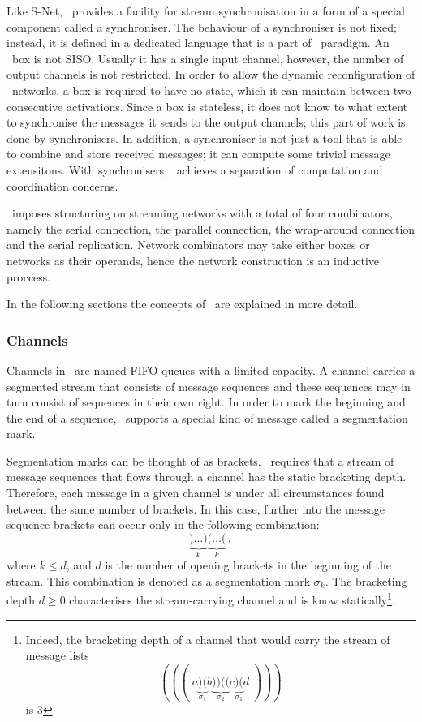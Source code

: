 Like S-Net, \ak\ provides a facility for stream synchronisation in a form of a special component called a synchroniser. The behaviour of a synchroniser is not fixed; instead, it is defined in a dedicated language that is a part of \ak\ paradigm. An \ak\ box is not SISO. Usually it has a single input channel, however, the number of output channels is not restricted. In order to allow the dynamic reconfiguration of \ak\ networks, a box is required to have no state, which it can maintain between two consecutive activations. Since a box is stateless, it does not know to what extent to synchronise the messages it sends to the output channels; this part of work is done by synchronisers. In addition, a synchroniser is not just a tool that is able to combine and store received messages; it can compute some trivial message extensitons. With synchronisers, \ak\ achieves a separation of computation and coordination concerns.

\ak\ imposes structuring on streaming networks with a total of four combinators, namely the serial connection, the parallel connection, the wrap-around connection and the serial replication. Network combinators may take either boxes or networks as their operands, hence the network construction is an inductive proccess. 

In the following sections the concepts of \ak\ are explained in more detail.


    \subsubsection{Channels}
Channels in \ak\ are named FIFO queues with a limited capacity. A channel carries a segmented stream that consists of message sequences and these sequences may in turn consist of sequences in their own right. In order to mark the beginning and the end of a sequence, \ak\ supports a special kind of message called a segmentation mark.

Segmentation marks can be thought of as brackets. \ak\ requires that a stream of message sequences that flows through a channel has the static bracketing depth. Therefore, each message in a given channel is under all circumstances found between the same number of brackets. In this case, further into the message sequence brackets can occur only in the following combination:
\[
\underbrace{)\ldots)}_k \underbrace{(\ldots(}_k\,,
\]
where $k \le d$, and $d$ is the number of opening brackets in the beginning of the stream. This combination is denoted as a segmentation mark $\sigma_k$. The bracketing depth $d \ge 0$ characterises the stream-carrying channel and is know statically\footnote{Indeed, the bracketing depth of a channel that would carry the stream of message lists
\[
(((\;a\underbrace{)(}_{\sigma_1}b\underbrace{))((}_{\sigma_2}c\underbrace{)(}_{\sigma_1}d\;)))
\]
is 3}.


